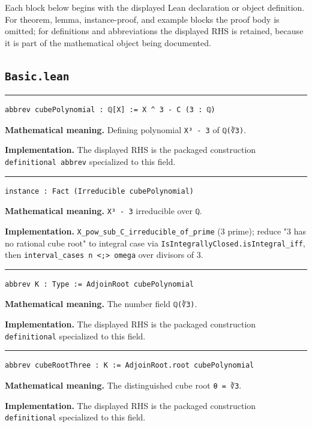 \documentclass[UTF8,a4paper,11pt,fontset=fandol]{ctexart}
\theoremstyle{definition}
\newcommand{\statementsep}{\par\medskip\hrule\medskip}
\begin{document}
Each block below begins with the displayed Lean declaration or object definition. For theorem, lemma, instance-proof, and example blocks the proof body is omitted; for definitions and abbreviations the displayed RHS is retained, because it is part of the mathematical object being documented.

\subsection{\texttt{Basic.lean}}

\statementsep
\begin{verbatim}
abbrev cubePolynomial : ℚ[X] := X ^ 3 - C (3 : ℚ)
\end{verbatim}
\noindent\textbf{Mathematical meaning.} Defining polynomial \texttt{X³ - 3} of \texttt{ℚ(∛3)}.\par
\noindent\textbf{Implementation.} The displayed RHS is the packaged construction \texttt{definitional abbrev} specialized to this field.\par
\statementsep
\begin{verbatim}
instance : Fact (Irreducible cubePolynomial)
\end{verbatim}
\noindent\textbf{Mathematical meaning.} \texttt{X³ - 3} irreducible over \texttt{ℚ}.\par
\noindent\textbf{Implementation.} \texttt{X\_\allowbreak{}pow\_\allowbreak{}sub\_\allowbreak{}C\_\allowbreak{}irreducible\_\allowbreak{}of\_\allowbreak{}prime} (3 prime); reduce "3 has no rational cube root" to integral case via \texttt{IsIntegrallyClosed.\allowbreak{}isIntegral\_\allowbreak{}iff}, then \texttt{interval\_\allowbreak{}cases n <;> omega} over divisors of 3.\par
\statementsep
\begin{verbatim}
abbrev K : Type := AdjoinRoot cubePolynomial
\end{verbatim}
\noindent\textbf{Mathematical meaning.} The number field \texttt{ℚ(∛3)}.\par
\noindent\textbf{Implementation.} The displayed RHS is the packaged construction \texttt{definitional} specialized to this field.\par
\statementsep
\begin{verbatim}
abbrev cubeRootThree : K := AdjoinRoot.root cubePolynomial
\end{verbatim}
\noindent\textbf{Mathematical meaning.} The distinguished cube root \texttt{θ = ∛3}.\par
\noindent\textbf{Implementation.} The displayed RHS is the packaged construction \texttt{definitional} specialized to this field.\par
\end{document}
